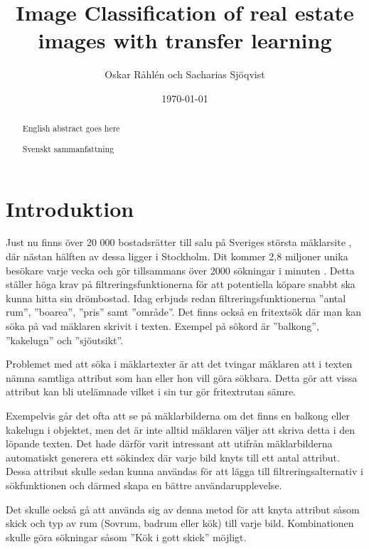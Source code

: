 \documentclass[]{kththesis}
\title{Image Classification of real estate images with transfer learning}
\author{Oskar Råhlén och Sacharias Sjöqvist}
\date{\today}
\begin{document}
\frontmatter
\titlepage

\begin{abstract}
    English abstract goes here
\end{abstract}

\begin{otherlanguage}{swedish}
  \begin{abstract}
    Svenskt sammanfattning
  \end{abstract}
\end{otherlanguage}
  
\tableofcontents

\mainmatter

\chapter{Introduktion}

Just nu finns över 20 000 bostadsrätter \parencite{hemnetstats} till salu på Sveriges största mäklarsite \parencite{hemnetom}, där nästan hälften av dessa ligger i Stockholm. 
Dit kommer 2,8 miljoner unika besökare varje vecka och gör tillsammans över 2000 sökningar i minuten \parencite{hemnetom}.
Detta ställer höga krav på filtreringsfunktionerna för att potentiella köpare snabbt ska kunna hitta sin drömbostad.
Idag erbjuds redan filtreringsfunktionerna ”antal rum”, ”boarea”, ”pris” samt ”område”. 
Det finns också en fritextsök där man kan söka på vad mäklaren skrivit i texten.
Exempel på sökord är ”balkong”, ”kakelugn” och ”sjöutsikt”. 

Problemet med att söka i mäklartexter är att det tvingar mäklaren att i texten nämna samtliga attribut som han eller hon vill göra sökbara. 
Detta gör att vissa attribut kan bli utelämnade vilket i sin tur gör fritextrutan sämre.

Exempelvis går det ofta att se på mäklarbilderna om det finns en balkong eller kakelugn i objektet, men det är inte alltid mäklaren väljer att skriva detta i den löpande texten.
Det hade därför varit intressant att utifrån mäklarbilderna automatiskt generera ett sökindex där varje bild knyts till ett antal attribut.
Dessa attribut skulle sedan kunna användas för att lägga till filtreringsalternativ i sökfunktionen och därmed skapa en bättre användarupplevelse.

Det skulle också gå att använda sig av denna metod för att knyta attribut såsom skick och typ av rum (Sovrum, badrum eller kök) till varje bild.
Kombinationen skulle göra sökningar såsom ”Kök i gott skick” möjligt.  
\end{document}
